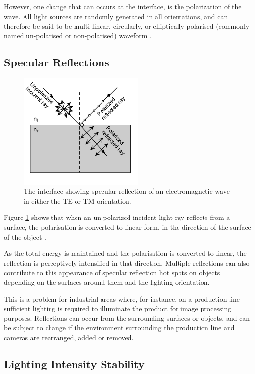 \documentclass[fleqn,twoside]{article}
\begin{document}
However, one change that can occurs at the interface, is the polarization of the wave. All light sources are randomly generated in all orientations, and can therefore be said to be multi-linear, circularly, or elliptically polarised (commonly named un-polarised or non-polarised) waveform \cite{artusi,nelson}.


\subsection{Specular Reflections} 

\begin{figure}[h]
	\centering
	\includegraphics[scale=0.9]{unpolar_polar.png}
	\caption{The interface showing specular reflection of an electromagnetic wave in either the TE or TM orientation.}
	\label{fig:unpolar_polar}
\end{figure}

Figure \ref{fig:unpolar_polar} shows that when an un-polarized incident light ray reflects from a surface, the polarisation is converted to linear form, in the direction of the surface of the object \cite{nelson}.

As the total energy is maintained and the polarisation is converted to linear, the reflection is perceptively intensified in that direction. Multiple reflections can also contribute to this appearance of specular reflection hot spots on objects depending on the surfaces around them and the lighting orientation.

This is a problem for industrial areas where, for instance, on a production line sufficient lighting is required to illuminate the product for image processing purposes. Reflections can occur from the surrounding surfaces or objects, and can be subject to change if the environment surrounding the production line and cameras are rearranged, added or removed.


\subsection{Lighting Intensity Stability}
\end{document}
